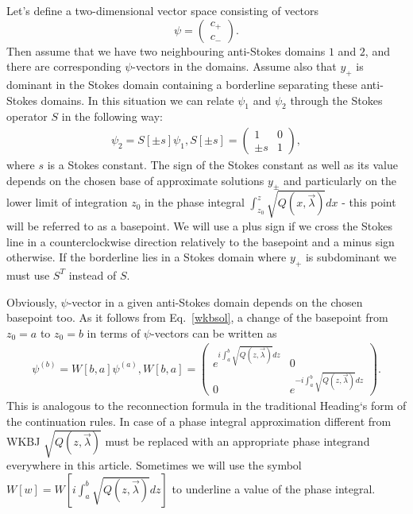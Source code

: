 \documentclass[aps,prl,preprint,superscriptaddress]{revtex4}
\begin{document}
Let's define a two-dimensional vector space consisting of vectors
\[
\psi= \begin{pmatrix} c_+ \\ c_- \end{pmatrix}.
\]
Then assume that we have two neighbouring anti-Stokes domains $1$ and $2$, and there are corresponding $\psi$-vectors in the domains. Assume also that $y_+$ is dominant in the Stokes domain containing a borderline separating these anti-Stokes domains. In this situation we can relate $\psi_1$ and $\psi_2$ through the Stokes operator $S$ in the following way:
\begin{eqnarray}
\psi_2 = S[\pm s] \psi_1, S[\pm s] =  \begin{pmatrix} 1 & 0 \\ \pm s & 1 \end{pmatrix},    
\label{S}
\end{eqnarray}
where $s$ is a Stokes constant. The sign of the Stokes constant as well as its value depends on the chosen base of approximate solutions $y_\pm$ and particularly on the lower limit of integration $z_0$ in the phase integral $\int_{z_0}^z \sqrt{Q(x,\vec \lambda)} dx$ - this point will be referred to as a basepoint. We will use a plus sign if we cross the Stokes line in a counterclockwise direction relatively to the basepoint and a minus sign otherwise. If the borderline lies in a Stokes domain where $y_+$ is subdominant we must use $S^T$ instead of $S$.

Obviously, $\psi$-vector in a given anti-Stokes domain depends on the chosen basepoint too. As it follows from Eq.~\ref{wkbsol}, a change of the basepoint from $z_0=a$ to $z_0=b$ in terms of $\psi$-vectors can be written as
\begin{eqnarray}
\psi^{(b)} = W[b,a] \psi^{(a)}, 
W[b,a] =  
\begin{pmatrix} e^{i \int_a^b \sqrt{Q(z,\vec{\lambda})} dz} & 0 \\ 0 & e^{-i \int_a^b \sqrt{Q(z,\vec{\lambda})} dz} \end{pmatrix}.    \label{W}
\end{eqnarray}
This is analogous to the reconnection formula in the traditional Heading`s form of the continuation rules. In case of a phase integral approximation different from WKBJ $\sqrt{Q(z,\vec{\lambda})}$ must be replaced with an appropriate phase integrand  everywhere in this article. Sometimes we will use the symbol $W[w]=W[i \int_a^b \sqrt{Q(z,\vec{\lambda})} dz]$ to underline a value of the phase integral. 
\end{document}
